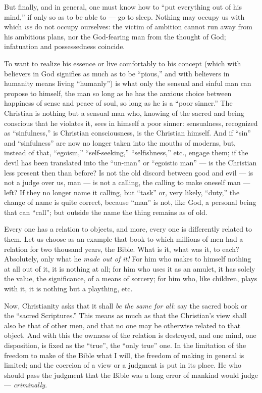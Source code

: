 But finally, and in general, one must know how to ``put everything out of his 
mind,'' if only so as to be able to --- go to sleep. Nothing may occupy us 
with which \textit{we} do not occupy ourselves: the victim of ambition cannot 
run away from his ambitious plans, nor the God-fearing man from the thought of 
God; infatuation and possessedness coincide.

To want to realize his essence or live comfortably to his concept (which with 
believers in God signifies as much as to be ``pious,'' and with believers in 
humanity means living ``humanly'') is what only the sensual and sinful man 
can propose to himself, the man so long as he has the anxious choice between 
happiness of sense and peace of soul, so long as he is a ``poor sinner.'' 
The Christian is nothing but a sensual man who, knowing of the sacred and 
being conscious that he violates it, sees in himself a poor sinner: 
sensualness, recognized as ``sinfulness,'' is Christian consciousness, is 
the Christian himself. And if ``sin'' and ``sinfulness'' are now no longer 
taken into the mouths of moderns, but, instead of that, ``egoism,'' 
``self-seeking,'' ``selfishness,'' etc., engage them; if the devil has 
been translated into the ``un-man'' or ``egoistic man'' --- is the 
Christian less present then than before? Is not the old discord between good 
and evil --- is not a judge over us, man --- is not a calling, the calling to 
make oneself man --- left? If they no longer name it calling, but ``task'' 
or, very likely, ``duty,'' the change of name is quite correct, because 
``man'' is not, like God, a personal being that can ``call''; but outside 
the name the thing remains as of old.

\myhrule


Every one has a relation to objects, and more, every one is differently 
related to them. Let us choose as an example that book to which millions of 
men had a relation for two thousand years, the Bible. What is it, what was it, 
to each? Absolutely, only what he \textit{made out of it!} For him who makes 
to himself nothing at all out of it, it is nothing at all; for him who uses it 
as an amulet, it has solely the value, the significance, of a means of 
sorcery; for him who, like children, plays with it, it is nothing but a 
plaything, etc.

Now, Christianity asks that it shall \textit{be the same for all}: say the 
sacred book or the ``sacred Scriptures.'' This means as much as that the 
Christian's view shall also be that of other men, and that no one may be 
otherwise related to that object. And with this the ownness of the relation is 
destroyed, and one mind, one disposition, is fixed as the ``true'', the 
``only true'' one. In the limitation of the freedom to make of the Bible 
what I will, the freedom of making in general is limited; and the coercion of 
a view or a judgment is put in its place. He who should pass the judgment that 
the Bible was a long error of mankind would judge --- \textit{criminally}.

